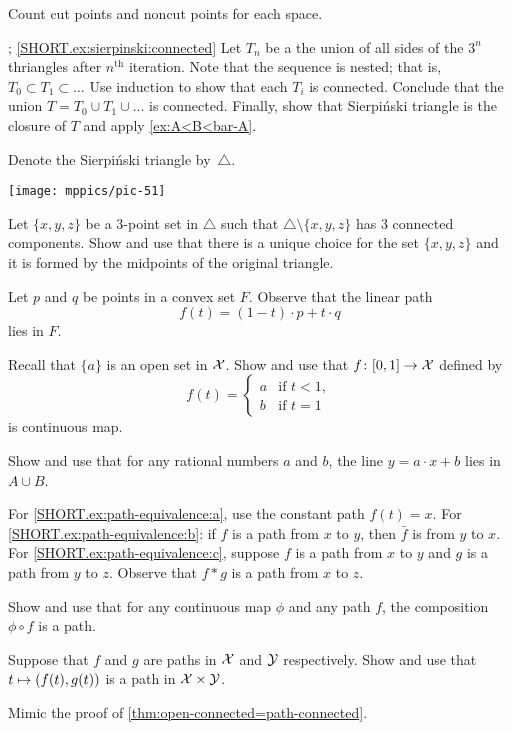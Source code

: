 \begin{multicols}{2}
Count cut points and noncut points for each space.

\parbf{\ref{ex:sierpinski}};
\ref{SHORT.ex:sierpinski:connected}
Let $T_n$ be a the union of all sides of the $3^n$ thriangles after $n^{\text{th}}$ iteration.
Note that the sequence is nested; that is, $T_0\subset T_1\subset \dots{}$
Use induction to show that each $T_i$ is connected.
Conclude that the union $T=T_0\cup T_1\cup\dots$ is connected.
Finally, show that Sierpi\'nski triangle is the closure of $T$ and apply \ref{ex:A<B<bar-A}.

Denote the Sierpi\'nski triangle by~$\triangle$.

\begin{Figure}
\vskip-0mm
\centering
\texttt{[image: mppics/pic-51]}
\end{Figure}

Let $\{x,y,z\}$ be a 3-point set in $\triangle$ such that $\triangle \setminus\{x,y,z\}$ has 3 connected components.
Show and use that there is a unique choice for the set $\{x,y,z\}$ and 
it is formed by the midpoints of the original triangle.

Let $p$ and $q$ be points in a convex set $F$.
Observe that the linear path 
\[f(t)=(1-t)\cdot p+t\cdot q\]
lies in $F$.

Recall that $\{a\}$ is an open set in $\mathcal{X}$.
Show and use that $f\colon[0,1]\to\mathcal{X}$ defined by 
\[f(t)=
\begin{cases}
a&\text{if\ }t<1,
\\
b&\text{if\ }t=1
\end{cases}
\]
is continuous map.

Show and use that for any rational numbers $a$ and $b$, the line $y=a\cdot x+b$ lies in $A\cup B$.

 For \ref{SHORT.ex:path-equivalence:a}, use the constant path $f(t)=x$.
For \ref{SHORT.ex:path-equivalence:b}: if $f$ is a path from $x$ to $y$, then $\bar f$ is from $y$ to $x$.
For \ref{SHORT.ex:path-equivalence:c}, suppose $f$ is a path from $x$ to $y$ and $g$ is a path from $y$ to $z$.
Observe that $f*g$ is a path from $x$ to $z$.


Show and use that for any continuous map $\phi$ and any path $f$, the composition $\phi\circ f$ is a path. 

Suppose that $f$ and $g$ are paths in $\mathcal{X}$ and $\mathcal{Y}$ respectively.
Show and use that $t\z\mapsto (f(t),g(t))$ is a path in $\mathcal{X}\times\mathcal{Y}$.

 Mimic the proof of \ref{thm:open-connected=path-connected}.


\end{multicols}
